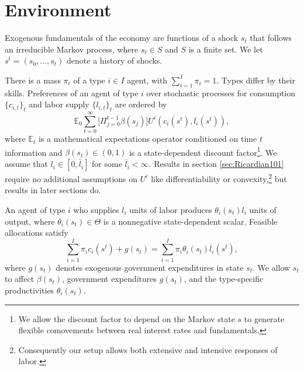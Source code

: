 \documentclass[thmsb,11pt]{article}
\begin{document}



\section{Environment\label{Sec: environment}}

\smallskip  %
Exogenous fundamentals
of the
economy are  functions of a shock  $s_{t}$  that follows an irreducible Markov process, where $s_{t}\in S$ and $S$ is a finite set. We let $s^{t}=\left(
s_{0},...,s_{t}\right) $ denote a history of shocks.

There is a mass $\pi _{i}$
of a type $i\in I$ agent, with $\sum_{i=1}^{I}\pi _{i}=1.$ Types differ by their skills.
Preferences of an
agent of type $i$ over stochastic processes for consumption $\{c_{i,t}\}_t$
and labor supply $\{l_{i,t}\}_t$ are ordered by
\begin{equation}
\mathbb{E}_{0}\sum_{t=0}^{\infty } \bigl[\Pi_{j=0}^{t-1}\beta(s_j)\bigr] U^{i}\left(
c_{i}(s^t),l_{i}(s^t)\right),  \label{utility lifetime}
\end{equation}%
where $\mathbb{E}_{t}$ is a mathematical expectations operator conditioned
on time $t$ information and $\beta(s_t) \in \left( 0,1\right) $ is a state-dependent discount
factor\footnote{We allow the discount factor to depend on the Markov state $s$ to generate flexible  comovements between real interest rates and fundamentals. }. We assume that $l_{i}\in \left[ 0,\bar{l}_{i}\right] $ for some $%
\bar{l}_{i}<\infty .$ Results in section  \ref{sec:Ricardian101} require no
additional assumptions on $U^{i}$ like  differentiability or convexity,\footnote{Consequently  our setup allows both extensive and intensive responses of labor.}  but results in later sections do.

An agent of type $i$ who supplies $l_{i}$ units of labor produces $\theta
_{i}\left( s_t\right) l_{i}$ units of output, where $\theta _{i}(s_t)\in \Theta $
is a nonnegative state-dependent scalar. Feasible allocations satisfy
\begin{equation}%
\sum_{i=1}^{I}\pi_{i}c_{i}(s^t)+g\left( s_{t}\right) =\sum_{i=1}^{I}\pi
_{i}\theta _{i}\left( s_{t}\right) l_{i}(s^t),  \label{feasibility goods}
\end{equation}%
where $g\left( s_{t}\right) $ denotes exogenous government expenditures in
state $s_{t}.$
 We allow $s_t$ to
affect $\beta(s_t)$, government expenditures $g(s_t)$, and the type-specific productivities $\theta_i(s_t)$.
\end{document}
